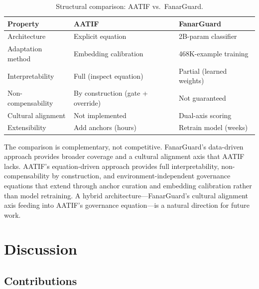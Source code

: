 \documentclass[11pt,a4paper]{article}
\begin{document}
\begin{table}[h]
\centering
\caption{Structural comparison: AATIF vs.\ FanarGuard.}
\label{tab:fanarguard}
\begin{tabular}{lll}
\toprule
Property & AATIF & FanarGuard \\
\midrule
Architecture & Explicit equation & 2B-param classifier \\
Adaptation method & Embedding calibration & 468K-example training \\
Interpretability & Full (inspect equation) & Partial (learned weights) \\
Non-compensability & By construction (gate + override) & Not guaranteed \\
Cultural alignment & Not implemented & Dual-axis scoring \\
Extensibility & Add anchors (hours) & Retrain model (weeks) \\
\bottomrule
\end{tabular}
\end{table}

The comparison is complementary, not competitive. FanarGuard's data-driven approach provides broader coverage and a cultural alignment axis that AATIF lacks. AATIF's equation-driven approach provides full interpretability, non-compensability by construction, and environment-independent governance equations that extend through anchor curation and embedding calibration rather than model retraining. A hybrid architecture---FanarGuard's cultural alignment axis feeding into AATIF's governance equation---is a natural direction for future work.


\section{Discussion}
\label{sec:discussion}

\subsection{Contributions}
\end{document}
